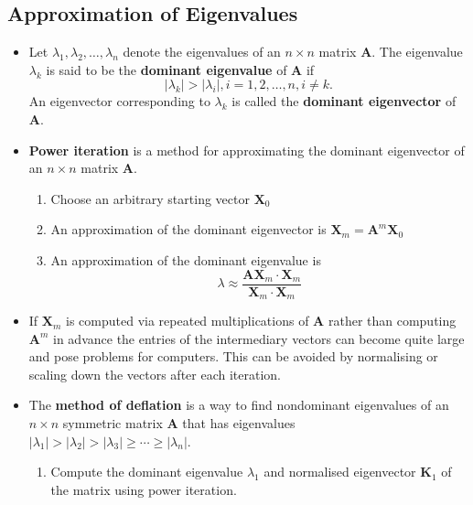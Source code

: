 \documentclass{article}
\begin{document}
\subsection{Approximation of Eigenvalues}

\begin{itemize}
  \item Let $\lambda_1, \lambda_2, \ldots, \lambda_n$ denote the eigenvalues of an $n \times n$ matrix $\mathbf{A}$. The eigenvalue $\lambda_k$ is said to be the \textbf{dominant eigenvalue} of $\mathbf{A}$ if \[|\lambda_k| > |\lambda_i|, i = 1, 2, \ldots, n, i \ne k.\] An eigenvector corresponding to $\lambda_k$ is called the \textbf{dominant eigenvector} of $\mathbf{A}$.

  \item \textbf{Power iteration} is a method for approximating the dominant eigenvector of an $n \times n$ matrix $\mathbf{A}$.

        \begin{enumerate}
          \item Choose an arbitrary starting vector $\mathbf{X}_0$

          \item An approximation of the dominant eigenvector is $\mathbf{X}_m = \mathbf{A}^m \mathbf{X}_0$

          \item An approximation of the dominant eigenvalue is \[\lambda \approx \frac{\mathbf{A} \mathbf{X}_m \cdot \mathbf{X}_m}{\mathbf{X}_m \cdot \mathbf{X}_m}\]
        \end{enumerate}

  \item If $\mathbf{X}_m$ is computed via repeated multiplications of $\mathbf{A}$ rather than computing $\mathbf{A}^m$ in advance the entries of the intermediary vectors can become quite large and pose problems for computers. This can be avoided by normalising or scaling down the vectors after each iteration.

  \item The \textbf{method of deflation} is a way to find nondominant eigenvalues of an $n \times n$ symmetric matrix $\mathbf{A}$ that has eigenvalues \\ $|\lambda_1| > |\lambda_2| > |\lambda_3| \ge \cdots \ge |\lambda_n|$.

        \begin{enumerate}
          \item Compute the dominant eigenvalue $\lambda_1$ and normalised eigenvector $\mathbf{K}_1$ of the matrix using power iteration.


\end{enumerate}
\end{itemize}
\end{document}

